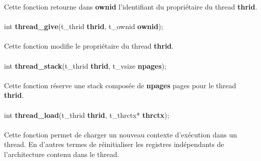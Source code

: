\documentclass[10pt,a4wide]{article}
\begin{document}
Cette fonction retourne dans \textbf{ownid} l'identifiant du propri\'etaire
du thread \textbf{thrid}.

\paragraph{}

\hspace{1.5cm}int \textbf{thread\_give}(t\_thrid \textbf{thrid},
                                        t\_ownid \textbf{ownid});

\paragraph{}

Cette fonction modifie le propri\'etaire du thread \textbf{thrid}.

\paragraph{}

\hspace{1.5cm}int \textbf{thread\_stack}(t\_thrid \textbf{thrid},
                                         t\_vsize \textbf{npages});

\paragraph{}

Cette fonction r\'eserve une stack compos\'ee de \textbf{npages}
pages pour le thread \textbf{thrid}.

\paragraph{}

\hspace{1.5cm}int \textbf{thread\_load}(t\_thrid \textbf{thrid},
                                        t\_thrctx* \textbf{thrctx});

\paragraph{}

Cette fonction permet de charger un nouveau contexte d'ex\'ecution
dans un thread. En d'autres termes de r\'einitialiser les registres
ind\'ependants de l'architecture contenu dans le thread.

\paragraph{}
\end{document}
